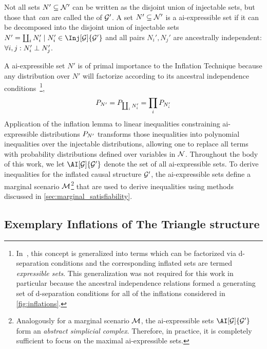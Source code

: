 \documentclass[aps, 10pt, english, twoside, pra, nofootinbib, tightenlines, longbibliography, superscriptaddress]{revtex4-1}
\begin{document}
    Not all sets $N' \subseteq \mathcal{N}'$ can be written as the disjoint union of injectable sets, but those that \textit{can} are called the  of $\mathcal{G}'$. A set $N' \subseteq \mathcal{N}'$ is a ai-expressible set if it can be decomposed into the disjoint union of injectable sets $N' = \coprod_{i} N'_i \mid N'_i \in \Inj[\graph]{\graph'}$ and all pairs $N_i', N_j'$ are ancestrally independent: $\forall i, j : N_i' \perp N_j'$.

    A ai-expressible set $N'$ is of primal importance to the Inflation Technique because any distribution over $N'$ will factorize according to its ancestral independence conditions~\cite{Pearl_2009}\footnote{In~\cite{Inflation}, this concept is generalized into terms which can be factorized via d-separation conditions and the corresponding inflated sets are termed \textit{expressible sets}. This generalization was not required for this work in particular because the ancestral independence relations formed a generating set of d-separation conditions for all of the inflations considered in \cref{fig:inflations}.},
    \[ \prob[N'] = \prob[\coprod_i N'_i] = \prod_{i}\prob[N'_i] \]
    Application of the inflation lemma to linear inequalities constraining ai-expressible distributions $\prob[N']$ transforms those inequalities into polynomial inequalities over the injectable distributions, allowing one to replace all terms with probability distributions defined over variables in $\mathcal{N}$. Throughout the body of this work, we let $\AI[\graph]{\graph'}$ denote the set of all ai-expressible sets. To derive inequalities for the inflated causal structure $\mathcal{G}'$, the ai-expressible sets define a marginal scenario $\mathcal{M}$\footnote{Analogously for a marginal scenario $\mathcal{M}$, the ai-expressible sets $\AI[\graph]{\graph'}$ form an \textit{abstract simplicial complex}. Therefore, in practice, it is completely sufficient to focus on the maximal ai-expressible sets.} that are used to derive inequalities using methods discussed in \cref{sec:marginal_satisfiability}.

    \subsection{Exemplary Inflations of The Triangle structure}
    \label{sec:exemplary_inflations_of_the_triangle structure}
\end{document}
